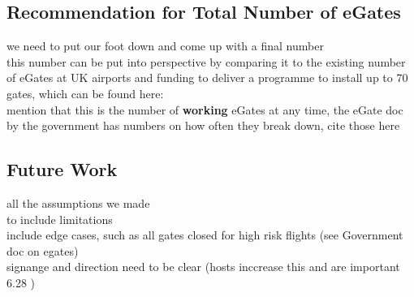 \documentclass[10pt]{article}
\begin{document}
\subsection{Recommendation for Total Number of eGates}
we need to put our foot down and come up with a final number \\ 
this number can be put into perspective by comparing it to the existing number of eGates at UK airports and funding to  deliver a programme to install up to 70 gates, which can be found here: \cite{Inspection_eGates} \\
mention that this is the number of \textbf{working} eGates at any time, the eGate doc by the government has numbers on how often they break down, cite those here

\subsection{Future Work}
all the assumptions we made \\
to include limitations \\
include edge cases, such as all gates closed for high risk flights (see Government doc on \glspl{egate}) \\
signange and direction need to be clear (hosts inccrease this and are important 6.28 \cite{Inspection_eGates})

{\footnotesize
}
% 
\end{document}
